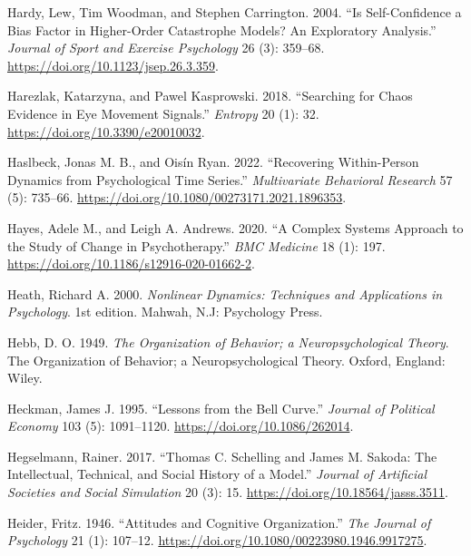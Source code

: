 \documentclass[
  a4paper,
  DIV=11,
  numbers=noendperiod,
  oneside]{scrreprt}
\newlength{\cslhangindent}
\newlength{\cslentryspacingunit} %
\newenvironment{CSLReferences}[2] %
 {%
  \setlength{\parindent}{0pt}
  \ifodd #1
  \let\oldpar\par
  \def\par{\hangindent=\cslhangindent\oldpar}
  \fi
  \setlength{\parskip}{#2\cslentryspacingunit}
 }%
 {}
\begin{document}
\begin{CSLReferences}{1}{0}
\leavevmode{}%
Hardy, Lew, Tim Woodman, and Stephen Carrington. 2004. {``Is
Self-Confidence a Bias Factor in Higher-Order Catastrophe Models? An
Exploratory Analysis.''} \emph{Journal of Sport and Exercise Psychology}
26 (3): 359--68. \url{https://doi.org/10.1123/jsep.26.3.359}.

\leavevmode{}%
Harezlak, Katarzyna, and Pawel Kasprowski. 2018. {``Searching for Chaos
Evidence in Eye Movement Signals.''} \emph{Entropy} 20 (1): 32.
\url{https://doi.org/10.3390/e20010032}.

\leavevmode{}%
Haslbeck, Jonas M. B., and Oisín Ryan. 2022. {``Recovering
{Within-Person Dynamics} from {Psychological Time Series}.''}
\emph{Multivariate Behavioral Research} 57 (5): 735--66.
\url{https://doi.org/10.1080/00273171.2021.1896353}.

\leavevmode{}%
Hayes, Adele M., and Leigh A. Andrews. 2020. {``A Complex Systems
Approach to the Study of Change in Psychotherapy.''} \emph{BMC Medicine}
18 (1): 197. \url{https://doi.org/10.1186/s12916-020-01662-2}.

\leavevmode{}%
Heath, Richard A. 2000. \emph{Nonlinear {Dynamics}: {Techniques} and
{Applications} in {Psychology}}. 1st edition. {Mahwah, N.J}: {Psychology
Press}.

\leavevmode{}%
Hebb, D. O. 1949. \emph{The Organization of Behavior; a
Neuropsychological Theory}. The Organization of Behavior; a
Neuropsychological Theory. {Oxford, England}: {Wiley}.

\leavevmode{}%
Heckman, James J. 1995. {``Lessons from the {Bell Curve}.''}
\emph{Journal of Political Economy} 103 (5): 1091--1120.
\url{https://doi.org/10.1086/262014}.

\leavevmode{}%
Hegselmann, Rainer. 2017. {``Thomas {C}. {Schelling} and {James M}.
{Sakoda}: {The Intellectual}, {Technical}, and {Social History} of a
{Model}.''} \emph{Journal of Artificial Societies and Social Simulation}
20 (3): 15. \url{https://doi.org/10.18564/jasss.3511}.

\leavevmode{}%
Heider, Fritz. 1946. {``Attitudes and {Cognitive Organization}.''}
\emph{The Journal of Psychology} 21 (1): 107--12.
\url{https://doi.org/10.1080/00223980.1946.9917275}.


\end{CSLReferences}
\end{document}
